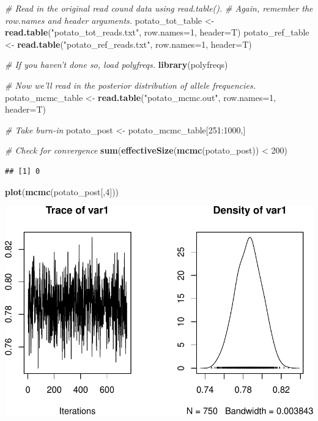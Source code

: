 \documentclass[]{article}
\newenvironment{Shaded}{\begin{snugshade}}{\end{snugshade}}
\newcommand{\KeywordTok}[1]{\textcolor[rgb]{0.13,0.29,0.53}{\textbf{{#1}}}}
\newcommand{\DataTypeTok}[1]{\textcolor[rgb]{0.13,0.29,0.53}{{#1}}}
\newcommand{\DecValTok}[1]{\textcolor[rgb]{0.00,0.00,0.81}{{#1}}}
\newcommand{\StringTok}[1]{\textcolor[rgb]{0.31,0.60,0.02}{{#1}}}
\newcommand{\CommentTok}[1]{\textcolor[rgb]{0.56,0.35,0.01}{\textit{{#1}}}}
\newcommand{\NormalTok}[1]{{#1}}
\begin{document}
\begin{Shaded}
\begin{Highlighting}[]
\CommentTok{# Read in the original read cound data using read.table().}
\CommentTok{# Again, remember the row.names and header arguments.}
\NormalTok{potato_tot_table <-}\StringTok{ }\KeywordTok{read.table}\NormalTok{(}\StringTok{"potato_tot_reads.txt"}\NormalTok{, }\DataTypeTok{row.names=}\DecValTok{1}\NormalTok{, }\DataTypeTok{header=}\NormalTok{T)}
\NormalTok{potato_ref_table <-}\StringTok{ }\KeywordTok{read.table}\NormalTok{(}\StringTok{"potato_ref_reads.txt"}\NormalTok{, }\DataTypeTok{row.names=}\DecValTok{1}\NormalTok{, }\DataTypeTok{header=}\NormalTok{T)}

\CommentTok{# If you haven't done so, load polyfreqs.}
\KeywordTok{library}\NormalTok{(polyfreqs)}

\CommentTok{# Now we'll read in the posterior distribution of allele frequencies.}
\NormalTok{potato_mcmc_table <-}\StringTok{ }\KeywordTok{read.table}\NormalTok{(}\StringTok{"potato_mcmc.out"}\NormalTok{, }\DataTypeTok{row.names=}\DecValTok{1}\NormalTok{, }\DataTypeTok{header=}\NormalTok{T)}

\CommentTok{# Take burn-in}
\NormalTok{potato_post <-}\StringTok{ }\NormalTok{potato_mcmc_table[}\DecValTok{251}\NormalTok{:}\DecValTok{1000}\NormalTok{,]}

\CommentTok{# Check for convergence}
\KeywordTok{sum}\NormalTok{(}\KeywordTok{effectiveSize}\NormalTok{(}\KeywordTok{mcmc}\NormalTok{(potato_post)) <}\StringTok{ }\DecValTok{200}\NormalTok{)}
\end{Highlighting}
\end{Shaded}

\begin{verbatim}
## [1] 0
\end{verbatim}

\begin{Shaded}
\begin{Highlighting}[]
\KeywordTok{plot}\NormalTok{(}\KeywordTok{mcmc}\NormalTok{(potato_post[,}\DecValTok{4}\NormalTok{]))}
\end{Highlighting}
\end{Shaded}

\includegraphics{supplement_files/figure-latex/unnamed-chunk-5-1.pdf}
\end{document}
